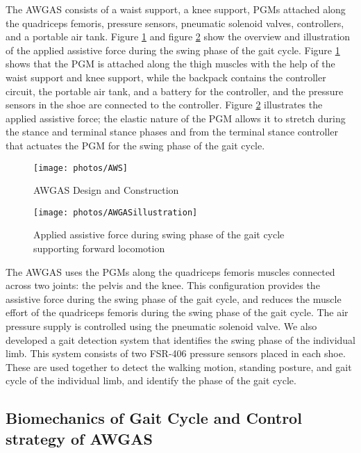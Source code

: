 \documentclass[paper,JRM,paper]{jaciiiarticle}
\begin{document}
The AWGAS consists of a waist support, a knee support, PGMs attached along the quadriceps femoris, pressure sensors, pneumatic solenoid valves, controllers, and a portable air tank. Figure \ref{fig:aws} and figure \ref{fig:awgasillustration} show the overview and illustration of the applied assistive force during the swing phase of the gait cycle. Figure \ref{fig:aws} shows that the PGM is attached along the thigh muscles with the help of the waist support and knee support, while the backpack contains the controller circuit, the portable air tank, and a battery for the controller, and the pressure sensors in the shoe are connected to the controller. Figure \ref{fig:awgasillustration} illustrates the applied assistive force; the elastic nature of the PGM allows it to stretch during the stance and terminal stance phases and from the terminal stance controller that actuates the PGM for the swing phase of the gait cycle.
 

\begin{figure}[h]
	\centering
	\texttt{[image: photos/AWS]}
	\caption{AWGAS Design and Construction}
	\label{fig:aws}
\end{figure}
\begin{figure}[h]
	\centering
	\texttt{[image: photos/AWGASillustration]}
	\caption{Applied assistive force during swing phase of the gait cycle supporting forward locomotion}
	\label{fig:awgasillustration}
\end{figure}


The AWGAS uses the PGMs along the quadriceps femoris muscles connected across two joints: the pelvis and the knee. This configuration provides the assistive force during the swing phase of the gait cycle, and reduces the muscle effort of the quadriceps femoris during the swing phase of the gait cycle. The air pressure supply is controlled using the pneumatic solenoid valve. We also developed a gait detection system that identifies the swing phase of the individual limb. This system consists of two FSR-406 pressure sensors placed in each shoe. These are used together to detect the walking motion, standing posture, and gait cycle of the individual limb, and identify the phase of the gait cycle.

\subsection{Biomechanics of Gait Cycle and Control strategy of AWGAS}
\end{document}
